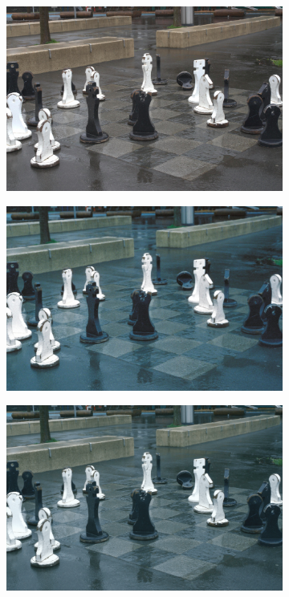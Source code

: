 \begin{figure}

    \begin{subfigure}[t]{.24\textwidth}
        \centering
        \includegraphics[width=\linewidth]{figures/digital-chess.png}
      \end{subfigure}
    \hfill
    \begin{subfigure}[t]{.24\textwidth}
        \centering
        \includegraphics[width=\linewidth]{figures/film-chess.png}
      \end{subfigure}
    \hfill
    \begin{subfigure}[t]{.24\textwidth}
        \centering
        \includegraphics[width=\linewidth]{figures/mse-vgg-noise-resize-chess.png}

\end{subfigure}
\end{figure}
